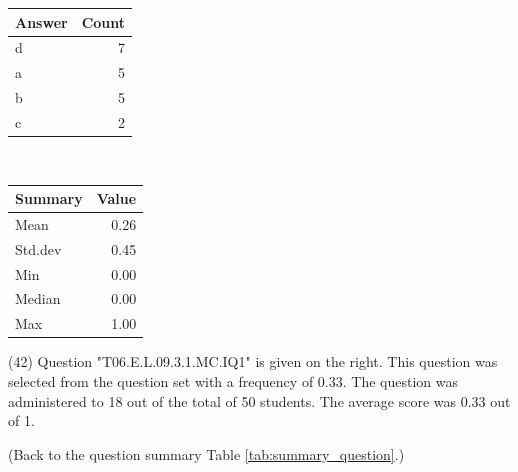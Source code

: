 \documentclass[12pt,english,nohyper]{tufte-handout}\usepackage[]{graphicx}\usepackage[]{color}
\begin{document}
\begin{center}%
\begin{tabular}{lr}
  \hline
Answer & Count \\ 
  \hline
d &   7 \\ 
  a &   5 \\ 
  b &   5 \\ 
  c &   2 \\ 
   \hline
\end{tabular}
~~~~~~~~%
\begin{tabular}{lr}
  \hline
Summary & Value \\ 
  \hline
Mean & 0.26 \\ 
  Std.dev & 0.45 \\ 
  Min & 0.00 \\ 
  Median & 0.00 \\ 
  Max & 1.00 \\ 
   \hline
\end{tabular}
\end{center}\newpage{} (42) Question "T06.E.L.09.3.1.MC.IQ1" is given on the right. This question was selected from the question set with a frequency of 0.33. The question was administered to 18 out of the total of 50 students. The average score was 0.33 out of 1.

 (Back to the question summary Table \ref{tab:summary_question}.)
\end{document}
